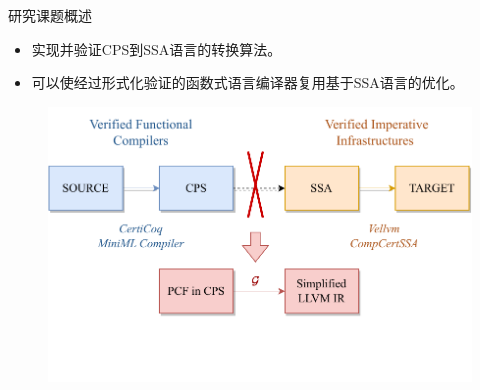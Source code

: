 \begin{frame}{研究课题概述}
  \begin{itemize}
    \item 实现并验证CPS到SSA语言的转换算法。
    \item 可以使经过形式化验证的函数式语言编译器复用基于SSA语言的优化。
  \end{itemize}
  \begin{figure}
    \centering
    \includegraphics[width=0.7\linewidth]{figures/partial.drawio.pdf}
    \label{fig:moti2}
  \end{figure}  
\end{frame}

